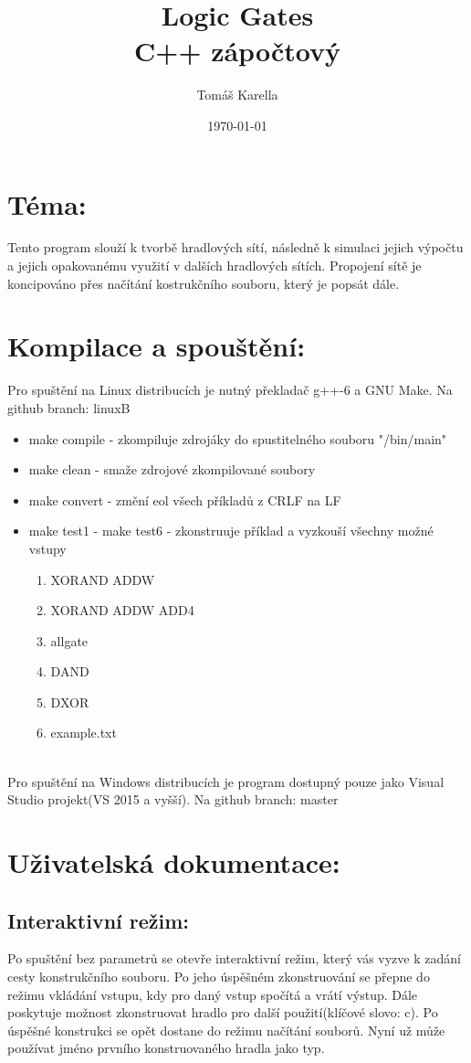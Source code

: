 \documentclass[12pt, oneside]{article}
\title{\vspace{-12ex}Logic Gates \\ C++ zápočtový }
\author{\vspace{-10ex}Tomáš Karella}
\date{\today}
\begin{document}
\maketitle
\section*{Téma:} Tento program slouží k tvorbě hradlových sítí, následně k simulaci jejich výpočtu a jejich opakovanému využití v dalších hradlových sítích. Propojení sítě je koncipováno přes načítání kostrukčního souboru, který je popsát dále.
\section*{Kompilace a spouštění:} Pro spuštění na Linux distribucích je nutný překladač g++-6 a GNU Make.  Na github branch: linuxB \\
\begin{itemize}
\item make compile -  zkompiluje zdrojáky do spustitelného souboru "/bin/main"
\item make clean - smaže zdrojové zkompilované soubory
\item make convert - změní eol všech příkladů z CRLF na LF
\item make test1 - make test6 - zkonstruuje příklad a vyzkouší všechny možné vstupy
\begin{enumerate}
\item XORAND ADDW 
\item XORAND ADDW ADD4
\item allgate 
\item DAND
\item DXOR
\item example.txt
\end{enumerate}  
\end{itemize}
 \ \\
Pro spuštění na Windows distribucích je program dostupný pouze jako Visual Studio projekt(VS 2015 a vyšší).  Na github branch: master\\ 
\section*{Uživatelská dokumentace:}
\subsection*{Interaktivní režim:}
Po spuštění bez parametrů se otevře interaktivní režim, který vás vyzve k zadání cesty konstrukčního souboru. Po jeho úspěšném zkonstruování se přepne do  režimu vkládání vstupu, kdy pro daný vstup spočítá a vrátí výstup. Dále poskytuje možnost zkonstruovat hradlo pro další použití(klíčové slovo: c).  Po úspěšné konstrukci se opět dostane do režimu načítání souborů. Nyní už může používat jméno prvního konstruovaného hradla jako typ. \\
\end{document}
